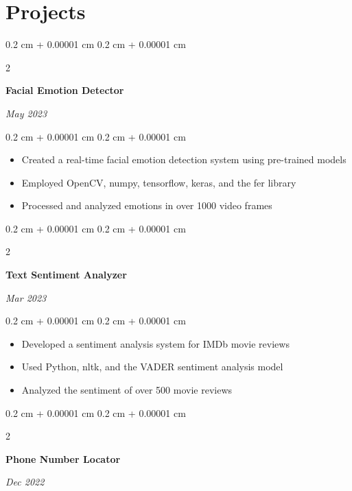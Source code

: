 \documentclass[12pt, letterpaper]{article}
\newenvironment{highlights}{
    \begin{itemize}[
        topsep=0.10 cm,
        parsep=0.10 cm,
        partopsep=0pt,
        itemsep=0pt,
        leftmargin=0.4 cm + 10pt
    ]
}{
    \end{itemize}
} %
\newenvironment{onecolentry}{
    \begin{adjustwidth}{
        0.2 cm + 0.00001 cm
    }{
        0.2 cm + 0.00001 cm
    }
}{
    \end{adjustwidth}
} %
\newenvironment{twocolentry}[2][]{
    \onecolentry
    \def\secondColumn{#2}
    \setcolumnwidth{\fill, 4.5 cm}
    \begin{paracol}{2}
}{
    \switchcolumn \raggedleft \secondColumn
    \end{paracol}
    \endonecolentry
} %
\begin{document}
    
    \section{Projects}



        
        \begin{twocolentry}{


        \textit{May 2023}}
            \textbf{Facial Emotion Detector}
        \end{twocolentry}

        \vspace{0.10 cm}
        \begin{onecolentry}
            \begin{highlights}
                \item Created a real-time facial emotion detection system using pre-trained models
                \item Employed OpenCV, numpy, tensorflow, keras, and the fer library
                \item Processed and analyzed emotions in over 1000 video frames
            \end{highlights}
        \end{onecolentry}


        \vspace{0.2 cm}

        \begin{twocolentry}{


        \textit{Mar 2023}}
            \textbf{Text Sentiment Analyzer}
        \end{twocolentry}

        \vspace{0.10 cm}
        \begin{onecolentry}
            \begin{highlights}
                \item Developed a sentiment analysis system for IMDb movie reviews
                \item Used Python, nltk, and the VADER sentiment analysis model
                \item Analyzed the sentiment of over 500 movie reviews
            \end{highlights}
        \end{onecolentry}


        \vspace{0.2 cm}

        \begin{twocolentry}{


        \textit{Dec 2022}}
            \textbf{Phone Number Locator}
        \end{twocolentry}
\end{document}
